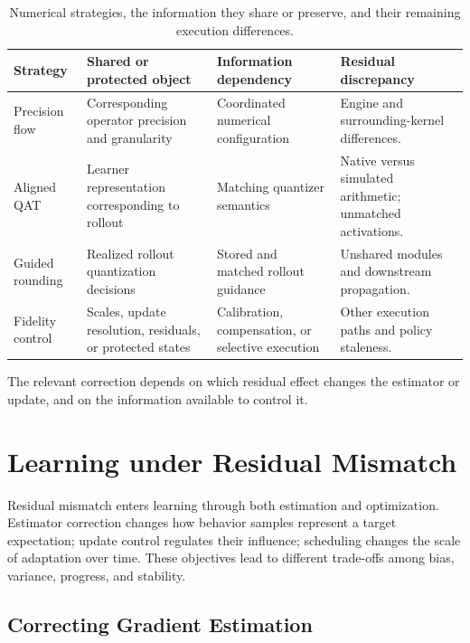 \begin{table}[!htbp]
\centering\small
\caption{Numerical strategies, the information they share or preserve, and their remaining execution differences.}\label{tab:numerical-interfaces}
\begin{tabularx}{\linewidth}{@{}P{29mm}YYY@{}}\toprule
{} \textbf{Strategy} & \textbf{Shared or protected object} & \textbf{Information dependency} & \textbf{Residual discrepancy}\\\midrule
Precision flow & Corresponding operator precision and granularity & Coordinated numerical configuration & Engine and surrounding-kernel differences.\\[3pt]
Aligned QAT & Learner representation corresponding to rollout & Matching quantizer semantics & Native versus simulated arithmetic; unmatched activations.\\[3pt]
Guided rounding & Realized rollout quantization decisions & Stored and matched rollout guidance & Unshared modules and downstream propagation.\\[3pt]
Fidelity control & Scales, update resolution, residuals, or protected states & Calibration, compensation, or selective execution & Other execution paths and policy staleness.\\\bottomrule
\end{tabularx}
\end{table}


The relevant correction depends on which residual effect changes the estimator or update, and on the information available to control it.

\section{Learning under Residual Mismatch}\label{sec:learning}
Residual mismatch enters learning through both estimation and optimization. Estimator correction changes how behavior samples represent a target expectation; update control regulates their influence; scheduling changes the scale of adaptation over time. These objectives lead to different trade-offs among bias, variance, progress, and stability.

\subsection{Correcting Gradient Estimation}\label{sec:b1}
